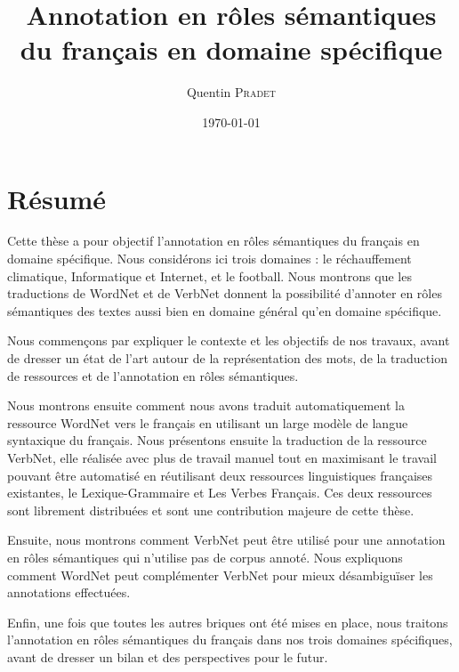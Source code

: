 \documentclass[oneside,parskip,draft]{scrbook}
\title{Annotation en rôles sémantiques \\ du français en domaine spécifique}
\author{Quentin \textsc{Pradet}}
\date{\today}
\begin{document}
\maketitle

\frontmatter



\chapter{Résumé}


Cette thèse a pour objectif l'annotation en rôles sémantiques du français en
domaine spécifique. Nous considérons ici trois domaines : le réchauffement
climatique, Informatique et Internet, et le football. Nous montrons que les
traductions de WordNet et de VerbNet donnent la possibilité d'annoter en rôles
sémantiques des textes aussi bien en domaine général qu'en domaine spécifique.

Nous commençons par expliquer le contexte et les objectifs de nos travaux,
avant de dresser un état de l'art autour de la représentation des mots, de la
traduction de ressources et de l'annotation en rôles sémantiques.

Nous montrons ensuite comment nous avons traduit automatiquement la ressource
WordNet vers le français en utilisant un large modèle de langue syntaxique du
français. Nous présentons ensuite la traduction de la ressource VerbNet, elle
réalisée avec plus de travail manuel tout en maximisant le travail pouvant être
automatisé en réutilisant deux ressources linguistiques françaises existantes,
le Lexique-Grammaire et Les Verbes Français. Ces deux ressources sont librement
distribuées et sont une contribution majeure de cette thèse.

Ensuite, nous montrons comment VerbNet peut être utilisé pour une annotation en
rôles sémantiques qui n'utilise pas de corpus annoté. Nous expliquons comment
WordNet peut complémenter VerbNet pour mieux désambiguïser les annotations
effectuées.

Enfin, une fois que toutes les autres briques ont été mises en place, nous
traitons l'annotation en rôles sémantiques du français dans nos trois domaines
spécifiques, avant de dresser un bilan et des perspectives pour le futur.
\end{document}
